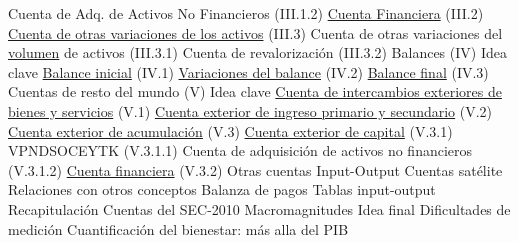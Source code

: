 \documentclass{nuevotema}
\begin{document}
\begin{esquema}[enumerate]
			\3 Cuenta de Adq. de Activos No Financieros (III.1.2)
			\3 \underline{Cuenta Financiera} (III.2)
			\3 \underline{Cuenta de otras variaciones de los activos} (III.3)
			\3 Cuenta de otras variaciones del \underline{volumen} de activos (III.3.1)
			\3 Cuenta de revalorización (III.3.2)
		\2 Balances (IV)
			\3 Idea clave
			\3 \underline{Balance inicial} (IV.1)
			\3 \underline{Variaciones del balance} (IV.2)
			\3 \underline{Balance final} (IV.3)
		\2 Cuentas de resto del mundo (V)
			\3 Idea clave
			\3 \underline{Cuenta de intercambios exteriores de bienes y servicios} (V.1)
			\3 \underline{Cuenta exterior de ingreso primario y secundario} (V.2)
			\3[] \underline{Cuenta exterior de acumulación} (V.3)
			\3 \underline{Cuenta exterior de capital} (V.3.1)
			\3 VPNDSOCEYTK (V.3.1.1)
			\3 Cuenta de adquisición de activos no financieros (V.3.1.2)
			\3 \underline{Cuenta financiera} (V.3.2)
		\2 Otras cuentas
			\3 Input-Output
			\3 Cuentas satélite
		\2 Relaciones con otros conceptos
			\3 Balanza de pagos
			\3 Tablas input-output
	\1[] 
		\2 Recapitulación
			\3 Cuentas del SEC-2010
			\3 Macromagnitudes
		\2 Idea final
			\3 Dificultades de medición
			\3 Cuantificación del bienestar: más alla del PIB

\end{esquema}

\esquemalargo
\end{document}
